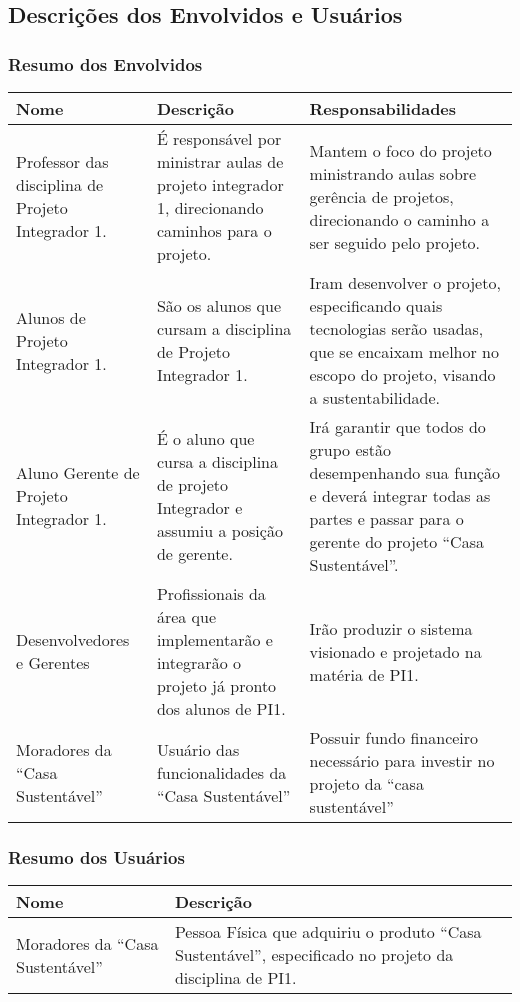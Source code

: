 \subsection{Descrições dos Envolvidos e Usuários}

\subsubsection{Resumo dos Envolvidos}

\begin{longtable}{|m{5cm}|m{5cm}|m{5cm}|}
	\hline \textbf{Nome} & \textbf{Descrição} & \textbf{Responsabilidades}\\
	\hline Professor das disciplina de Projeto Integrador 1. & É responsável por ministrar aulas de projeto integrador 1, direcionando caminhos para o projeto. & Mantem o foco do projeto ministrando aulas sobre gerência de projetos, direcionando o caminho a ser seguido pelo projeto. \\
	\hline Alunos de  Projeto Integrador 1. & São os alunos que cursam a disciplina de  Projeto Integrador 1. & Iram desenvolver o projeto, especificando quais tecnologias serão usadas, que se encaixam melhor no escopo do projeto, visando a sustentabilidade.\\
	\hline Aluno Gerente de Projeto Integrador 1. & É o aluno que cursa a disciplina de projeto Integrador e assumiu a posição de gerente. & Irá garantir que todos do grupo estão desempenhando sua função e deverá integrar todas as partes e passar para o gerente do projeto “Casa Sustentável”.\\
	\hline Desenvolvedores e Gerentes & Profissionais da área que implementarão e integrarão o projeto já pronto dos alunos de PI1. & Irão produzir o sistema visionado e projetado na matéria de PI1.\\
	\hline Moradores da “Casa Sustentável” & Usuário das funcionalidades da “Casa Sustentável” & Possuir fundo financeiro necessário para investir no projeto da “casa sustentável”\\
	\hline
\end{longtable}

\subsubsection{Resumo dos Usuários}

\begin{longtable}{|m{5cm}|m{10cm}|}
	\hline \textbf{Nome} & \textbf{Descrição}\\
	\hline Moradores da “Casa Sustentável” & Pessoa Física que adquiriu o produto “Casa Sustentável”, especificado no projeto da disciplina de PI1.\\
	\hline
\end{longtable}

